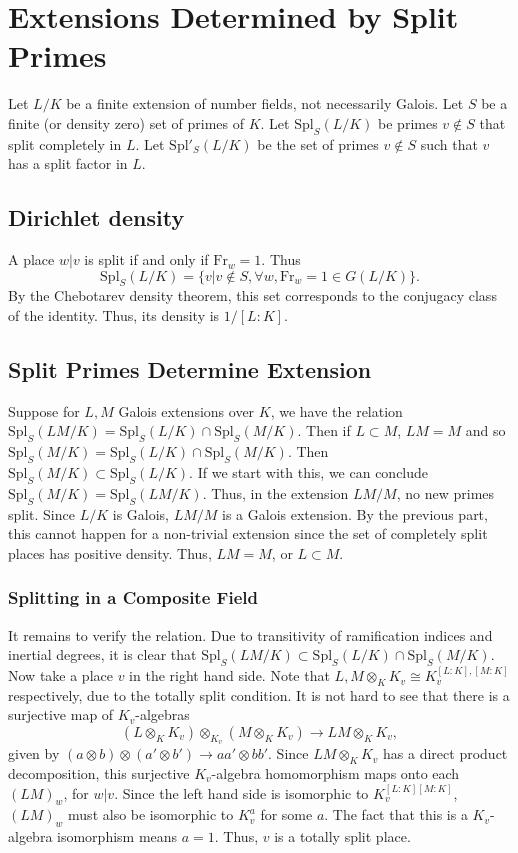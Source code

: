 \documentclass[12pt]{amsart}
\theoremstyle{named}
\newcommand{\Spl}{\mathrm{Spl}}
\newcommand{\Fr}{\mathrm{Fr}}
\begin{document}
\section{Extensions Determined by Split Primes} Let $L/K$ be a finite extension
of number fields, not necessarily Galois. Let $S$ be a finite (or density zero)
set of primes of $K$. Let $\Spl_S(L/K)$ be primes $v \not\in S$ that split
completely in $L$. Let $\Spl'_S(L/K)$ be the set of primes $v \not\in S$ such
that $v$ has a split factor in $L$.
\subsection{Dirichlet density} A place $w|v$ is split if and only if
$\Fr_w = 1$. Thus
\[\Spl_S(L/K) = \{ v | v \not\in S, \forall w, \Fr_w = 1 \in G(L/K) \}. \]
By the Chebotarev density theorem, this set corresponds to the conjugacy class
of the identity. Thus, its density is $1/[L:K]$.

\subsection{Split Primes Determine Extension} Suppose for $L, M$ Galois
extensions over $K$, we have the relation
$\Spl_S(LM/K) = \Spl_S(L/K) \cap \Spl_S(M/K)$.
Then if $L \subset M$, $LM = M$ and so
$\Spl_S(M/K) = \Spl_S(L/K) \cap \Spl_S(M/K)$. Then
$\Spl_S(M/K) \subset \Spl_S(L/K)$. If we start with this, we can conclude
$\Spl_S(M/K) = \Spl_S(LM/K)$. Thus, in the extension $LM/M$, no new primes
split. Since $L/K$ is Galois, $LM/M$ is a Galois extension. By the previous
part, this cannot happen for a non-trivial extension since the set of
completely split places has positive density. Thus,
$LM = M$, or $L \subset M$.

\subsubsection{Splitting in a Composite Field}  It remains to verify the
relation. Due to transitivity of ramification indices and inertial degrees, it
is clear that
$\Spl_S(LM/K) \subset \Spl_S(L/K) \cap \Spl_S(M/K)$.
Now take a place $v$ in the right hand side. Note that
$L, M \otimes_K K_v \cong K_v^{[L:K], [M:K]}$
respectively, due to the totally split condition. It is not hard to see that
there is a surjective map of $K_v$-algebras
\[ (L \otimes_K K_v) \otimes_{K_v} (M \otimes_K K_v) \rightarrow LM \otimes_K K_v, \]
given by $(a \otimes b) \otimes (a' \otimes b') \rightarrow aa' \otimes bb'$.
Since $LM \otimes_K K_v$ has a direct product decomposition, this surjective
$K_v$-algebra homomorphism maps onto each $(LM)_w$, for $w | v$. 
Since the left hand side is isomorphic to $K_v^{[L:K][M:K]}$, $(LM)_w$
must also be isomorphic to $K_v^a$ for some $a$. The fact that this is a
$K_v$-algebra isomorphism means $a = 1$. Thus, $v$ is a totally split place.
\end{document}
